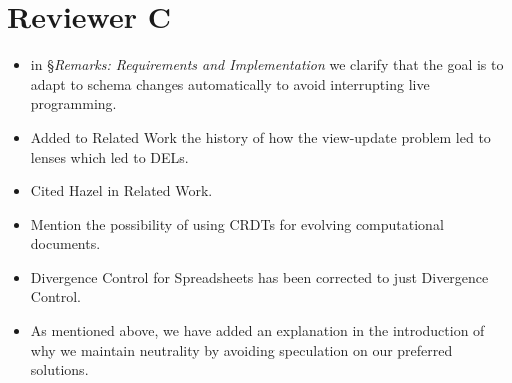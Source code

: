 \documentclass{article}
\begin{document}
\section{Reviewer C}
\begin{itemize}
  \item in \S\emph{Remarks: Requirements and Implementation} we clarify that the goal is to adapt to schema changes automatically to avoid interrupting live programming.

  \item Added to Related Work the history of how the view-update problem led to lenses which led to DELs.

  \item Cited Hazel in Related Work.

  \item Mention the possibility of using CRDTs for evolving computational documents.

  \item Divergence Control for Spreadsheets has been corrected to just Divergence Control.

  \item As mentioned above, we have added an explanation in the introduction of why we maintain neutrality by avoiding speculation on our preferred solutions.
\end{itemize}
\end{document}
